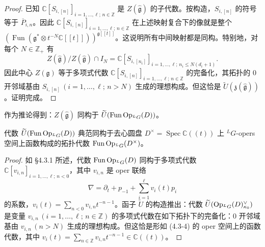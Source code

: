 \begin{proof}
已知 $\mathbb{C}[S_{i,[n]}]_{i=1,\dots,\ell;\,n\in\mathbb{Z}}$ 是 $Z(\hat{\mathfrak{g}})$ 的子代数。按构造，$S_{i,[n]}$ 的符号等于 $\overline{P}_{i,n}$。因此 $\mathbb{C}[S_{i,[n]}]_{i=1,\dots,\ell;\,n\in\mathbb{Z}}$ 在上述映射复合下的像就是整个 $(\operatorname{Fun}(\mathfrak{g}^*\otimes t^{-N}\mathbb{C}[[t]]))^{\mathfrak{g}[[t]]}$。这说明所有中间映射都是同构。特别地，对每个 $N\in\mathbb{Z}_+$ 有
\[
    Z(\hat{\mathfrak{g}})/Z(\hat{\mathfrak{g}})\cap I_N=\mathbb{C}[S_{i,[n_i]}]_{i=1,\dots,\ell;\,n_i\le N(d_i+1)}.
\]
因此中心 $Z(\mathfrak{g})$ 等于多项式代数 $\mathbb{C}[S_{i,[n]}]_{i=1,\dots,\ell;\,n\in\mathbb{Z}}$ 的完备化，其拓扑的 $0$ 开邻域基由 $S_{i,[n]}\,(i=1,\dots,\ell;\,n>N)$ 生成的理想构成。但这恰是 $\widetilde{U}(\mathfrak{z}(\hat{\mathfrak{g}}))$。证明完成。
\end{proof}


作为推论得到：$Z(\hat{\mathfrak{g}})$ 同构于 $\widetilde{U}(\operatorname{Fun}\operatorname{Op}_{{}^LG}(D))$。

\begin{lemma}
    代数 $\widetilde{U}(\operatorname{Fun}\operatorname{Op}_{{}^LG}(D))$ 典范同构于去心圆盘 $D^\times=\operatorname{Spec}\mathbb{C}((t))$ 上 ${}^LG$-opers 空间上函数构成的拓扑代数 $\operatorname{Fun}\operatorname{Op}_{{}^LG}(D^\times)$。
\end{lemma}

\begin{proof}
如 §4.3.1 所述，代数 $\operatorname{Fun}\operatorname{Op}_{{}^LG}(D)$ 同构于多项式代数 $\mathbb{C}[v_{i,n}]_{i=1,\dots,\ell;\,n<0}$，其中 $v_{i,n}$ 是 oper 联络
\begin{equation}
    \nabla=\partial_t+p_{-1}+\sum_{i=1}^{\ell}v_i(t)p_i
    \tag{4.3-4}
\end{equation}
的系数，$v_i(t)=\sum_{n<0}v_{i,n}t^{-n-1}$。函子 $\widetilde{U}$ 的构造推出：代数 $\widetilde{U}(\operatorname{Op}_{{}^LG}(D)_{\kappa_0}^{\vee})$ 是变量 $v_{i,n}\,(i=1,\dots,\ell;\,n\in\mathbb{Z})$ 的多项式代数在如下拓扑下的完备化：$0$ 开邻域基由 $v_{i,n}\,(n>N)$ 生成的理想构成。但这恰是形如 (4.3-4) 的 oper 空间上的函数代数，其中 $v_i(t)=\sum_{n\in\mathbb{Z}}v_{i,n}t^{-n-1}\in\mathbb{C}((t))$。
\end{proof}

